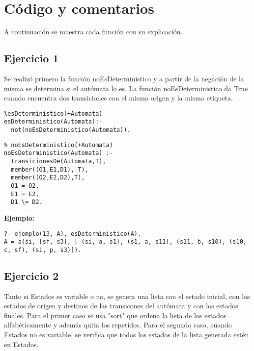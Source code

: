 \documentclass[10pt, a4paper,english,spanish,hidelinks]{article}
\begin{document}
\pagestyle{myheadings}
\maketitle
{}

\thispagestyle{empty}
\tableofcontents
\newpage
\section{Código y comentarios}
A continuación se muestra cada función con su explicación.

\subsection{Ejercicio 1}
Se realizó primero la función noEsDeterministico y a partir de la negación
de la misma se determina si el autómata lo es.
La función noEsDeterministico da True cuando encuentra dos transiciones con el mismo
origen y la misma etiqueta.

\begin{verbatim}
%esDeterministico(+Automata)
esDeterministico(Automata):-
  not(noEsDeterministico(Automata)).
\end{verbatim}

\begin{verbatim}
% noEsDeterministico(+Automata)
noEsDeterministico(Automata) :- 
  transicionesDe(Automata,T),
  member((O1,E1,D1), T),
  member((O2,E2,D2),T),
  O1 = O2,
  E1 = E2,
  D1 \= D2.
\end{verbatim}

\textbf{Ejemplo:}

\begin{verbatim}
?- ejemplo(13, A), esDeterministico(A).
A = a(si, [sf, s3], [ (si, a, s1), (s1, a, s11), (s11, b, s10), (s10, c, sf), (si, p, s3)]).
\end{verbatim}

\subsection{Ejercicio 2}

Tanto si Estados es variable o no, se genera una lista con el estado inicial,
con los estados de origen y destinos de las transicones del autómata y con
los estados finales. Para el primer caso se usa "sort" que ordena la lista
de los estados alfabéticamente y además quita los repetidos. Para el segundo
caso, cuando Estados no es variable, se verifica que todos los estados de la
lista generada estén en Estados.
\end{document}
